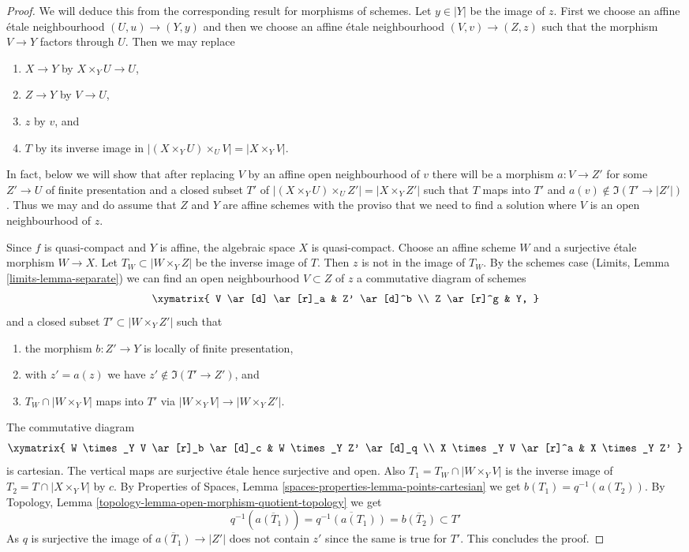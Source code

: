 \begin{proof}
We will deduce this from the corresponding result for morphisms of schemes.
Let $y \in |Y|$ be the image of $z$. First we choose an affine \'etale
neighbourhood $(U, u) \to (Y, y)$ and then we choose an affine \'etale
neighbourhood $(V, v) \to (Z, z)$ such that the morphism $V \to Y$
factors through $U$. Then we may replace
\begin{enumerate}
\item $X \to Y$ by $X \times_Y U \to U$,
\item $Z \to Y$ by $V \to U$,
\item $z$ by $v$, and
\item $T$ by its inverse image in
$|(X \times_Y U) \times_U V| = |X \times_Y V|$.
\end{enumerate}
In fact, below we will show that after replacing $V$ by an affine
open neighbourhood of $v$ there will be a morphism $a : V \to Z'$ for
some $Z' \to U$ of finite presentation and a closed subset $T'$
of $|(X \times_Y U) \times_U Z'| = |X \times_Y Z'|$ such that
$T$ maps into $T'$ and $a(v) \not \in \Im(T' \to |Z'|)$.
Thus we may and do assume that $Z$ and $Y$ are affine schemes
with the proviso that we need to find a solution where $V$
is an open neighbourhood of $z$.

\medskip\noindent
Since $f$ is quasi-compact and $Y$ is affine, the algebraic space
$X$ is quasi-compact. Choose an affine scheme $W$ and a surjective
\'etale morphism $W \to X$. Let $T_W \subset |W \times_Y Z|$
be the inverse image of $T$. Then $z$ is not in the image of
$T_W$. By the schemes case (Limits, Lemma \ref{limits-lemma-separate})
we can find an open neighbourhood $V \subset Z$ of $z$
a commutative diagram of schemes
$$
\xymatrix{
V \ar[d] \ar[r]_a & Z' \ar[d]^b \\
Z \ar[r]^g & Y,
}
$$
and a closed subset $T' \subset |W \times_Y Z'|$ such that
\begin{enumerate}
\item the morphism $b : Z' \to Y$ is locally of finite presentation,
\item with $z' = a(z)$ we have $z' \not \in \Im(T' \to Z')$, and
\item $T_W \cap |W \times_Y V|$ maps into $T'$ via
$|W \times_Y V| \to |W \times_Y Z'|$.
\end{enumerate}
The commutative diagram
$$
\xymatrix{
W \times_Y V \ar[r]_b \ar[d]_c & W \times_Y Z' \ar[d]_q \\
X \times_Y V \ar[r]^a & X \times_Y Z'
}
$$
is cartesian. The vertical maps are surjective \'etale hence surjective
and open. Also $T_1 = T_W \cap |W \times_Y V|$ is the inverse image of
$T_2 = T \cap |X \times_Y V|$ by $c$. By Properties of Spaces, Lemma
\ref{spaces-properties-lemma-points-cartesian}
we get $b(T_1) = q^{-1}(a(T_2))$. By
Topology, Lemma \ref{topology-lemma-open-morphism-quotient-topology}
we get
$$
q^{-1}(\overline{a(T_1)}) = \overline{q^{-1}(a(T_1))} =
\overline{b(T_2)} \subset T'
$$
As $q$ is surjective the image of $\overline{a(T_1)} \to |Z'|$
does not contain $z'$ since the same is true for $T'$. This
concludes the proof.
\end{proof}


